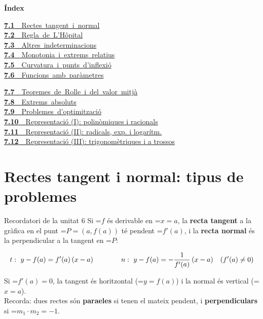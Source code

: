 \documentclass[11pt,a4paper]{article}
\newcommand{\fmm}[1]{\setbox0=\hbox{$#1$}\ifdim\wd0>\linewidth\fmdisp{#1}\else\mbox{\box0}\fi}
\newcommand{\fmdisp}[1]{\[\setbox2=\hbox{$\displaystyle #1$}\ifdim\wd2>\linewidth\resizebox{\linewidth}{!}{\box2}\else\box2\fi\]}
\begin{document}
\begin{tcolorbox}[colback=fmsurface,colframe=fmsurface,arc=3mm,left=4mm,right=4mm,top=2mm,bottom=2mm]
\small\textbf{Índex}\par\smallskip
\begin{minipage}[t]{0.49\linewidth}\small \mbox{\hyperlink{sec1}{\textbf{\color{fmgreen}7.1}\ \ Rectes tangent i normal}}\\[3pt]
\mbox{\hyperlink{sec2}{\textbf{\color{fmgreen}7.2}\ \ Regla de L'Hôpital}}\\[3pt]
\mbox{\hyperlink{sec3}{\textbf{\color{fmgreen}7.3}\ \ Altres indeterminacions}}\\[3pt]
\mbox{\hyperlink{sec4}{\textbf{\color{fmgreen}7.4}\ \ Monotonia i extrems relatius}}\\[3pt]
\mbox{\hyperlink{sec5}{\textbf{\color{fmgreen}7.5}\ \ Curvatura i punts d'inflexió}}\\[3pt]
\mbox{\hyperlink{sec6}{\textbf{\color{fmgreen}7.6}\ \ Funcions amb paràmetres}}\\[3pt]\end{minipage}\hfill\begin{minipage}[t]{0.49\linewidth}\small \mbox{\hyperlink{sec7}{\textbf{\color{fmgreen}7.7}\ \ Teoremes de Rolle i del valor mitjà}}\\[3pt]
\mbox{\hyperlink{sec8}{\textbf{\color{fmgreen}7.8}\ \ Extrems absoluts}}\\[3pt]
\mbox{\hyperlink{sec9}{\textbf{\color{fmgreen}7.9}\ \ Problemes d'optimització}}\\[3pt]
\hyperlink{sec10}{\textbf{\color{fmgreen}7.10}\ \ Representació (I): polinòmiques i racionals}\\[3pt]
\hyperlink{sec11}{\textbf{\color{fmgreen}7.11}\ \ Representació (II): radicals, exp. i logarítm.}\\[3pt]
\hyperlink{sec12}{\textbf{\color{fmgreen}7.12}\ \ Representació (III): trigonomètriques i a trossos}\\[3pt]\end{minipage}
\end{tcolorbox}

\section{Rectes tangent i normal: tipus de problemes}\hypertarget{sec1}{}

\begin{fmprop}{Recordatori de la unitat 6}
Si \fmm{f} és derivable en \fmm{x=a}, la \textbf{recta tangent} a la gràfica en el punt \fmm{P=(a,f(a))} té pendent \fmm{f'(a)}, i la \textbf{recta normal} és la perpendicular a la tangent en \fmm{P}:

\fmdisp{t:\ y-f(a)=f'(a)\,(x-a)\qquad\qquad n:\ y-f(a)=-\frac{1}{f'(a)}\,(x-a)\quad(f'(a)\neq0)}

Si \fmm{f'(a)=0}, la tangent és horitzontal (\fmm{y=f(a)}) i la normal és vertical (\fmm{x=a}). \\[2ex]
Recorda: dues rectes són \textbf{para\lgem{}eles} si tenen el mateix pendent, i \textbf{perpendiculars} si \fmm{m_1\cdot m_2=-1}.
\end{fmprop}
\end{document}
